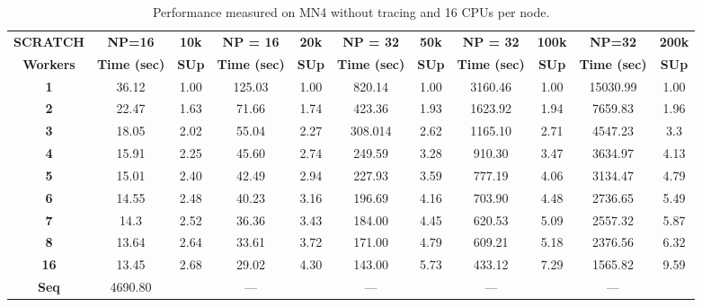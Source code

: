 \documentclass[10pt,journal,compsoc]{IEEEtran}
\let\MYoriglatexcaption\caption
\renewcommand{\caption}[2][\relax]{\MYoriglatexcaption[#2]{#2}}
\begin{document}
\begin{table*}[!t]
\centering
\caption{Performance measured on MN4 without tracing and 16 CPUs per node.}
\label{performance_table}
\begin{tabular*}{\textwidth}{c|cc|cc|cc|cc|cc}
 \textbf{SCRATCH}   & \textbf{NP=16} & \textbf{10k} & \textbf{NP = 16} & \textbf{20k} & \textbf{NP = 32} & \textbf{50k} & \textbf{NP = 32} & \textbf{100k} &  \textbf{NP=32} & \textbf{ 200k}\\ \cline{2-11} 
\textbf{Workers}     & \textbf{Time (sec)}   & \textbf{SUp}   & \textbf{Time (sec)}     & \textbf{SUp}   & \textbf{Time (sec)}     & \textbf{SUp}   & \textbf{Time (sec)}    & \textbf{SUp}    & \textbf{Time (sec)}   & \textbf{SUp} \\ \cline{1-11}
\textbf{1}           & 36.12        & 1.00              & 125.03          & 1.00              & 820.14           & 1.00              & 3160.46          & 1.00  &   15030.99 & 1.00          \\
\textbf{2}           & 22.47          & 1.63           & 71.66            & 1.74           & 423.36           & 1.93           & 1623.92          & 1.94 & 7659.83 & 1.96        \\
\textbf{3}           & 18.05          & 2.02           & 55.04           & 2.27           & 308.014          & 2.62           & 1165.10         & 2.71 & 4547.23 & 3.3           \\
\textbf{4}           & 15.91         & 2.25           & 45.60           & 2.74           & 249.59           & 3.28           & 910.30            & 3.47   & 3634.97 & 4.13        \\
\textbf{5}           & 15.01          & 2.40           & 42.49           & 2.94           & 227.93           & 3.59           & 777.19          & 4.06  & 3134.47 & 4.79         \\
\textbf{6}           & 14.55          & 2.48           & 40.23            & 3.16           & 196.69           & 4.16           & 703.90            & 4.48 & 2736.65 & 5.49           \\
\textbf{7}           & 14.3           & 2.52           & 36.36           & 3.43           & 184.00              & 4.45           & 620.53          & 5.09 & 2557.32 & 5.87           \\
\textbf{8}           & 13.64         & 2.64           & 33.61           & 3.72           & 171.00              & 4.79           & 609.21          & 5.18 & 2376.56 & 6.32           \\
\textbf{16}          & 13.45          & 2.68           & 29.02           & 4.30           & 143.00              & 5.73           & 433.12          & 7.29 & 1565.82 & 9.59           \\ \cline{1-11}
\textbf{Seq} & 4690.80         &                & ---              &                & ---              &                & ---              & & --- &                
\end{tabular*}
\end{table*}
\end{document}
